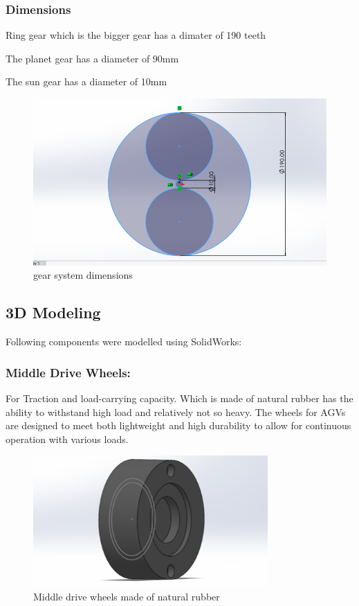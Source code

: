 \documentclass[../../main]{subfiles}
\begin{document}
\subsubsection{Dimensions}

Ring gear which is the bigger gear has a dimater of 190 teeth

The planet gear has a diameter of 90mm

The sun gear has a diameter of 10mm
\begin{figure}[h]
  \centering
\includegraphics[width=\textwidth]{sublatex/Opryrmi/media/image1.png}
\caption{gear system dimensions}
\end{figure}

\newpage
\subsection{3D Modeling}

Following components were modelled using SolidWorks:



  \subsubsection{Middle Drive Wheels:}
  For Traction and load-carrying capacity. Which is
  made of natural rubber has the ability to withstand high load and
  relatively not so heavy. The wheels for AGVs are designed to meet both
  lightweight and high durability to allow for continuous operation with
  various loads.
  \begin{figure}[h]
    \centering
    \includegraphics[width=0.8\textwidth]{sublatex/Opryrmi/media/image2.png} 
    \caption{Middle drive wheels made of natural rubber}
  \end{figure}
\end{document}
